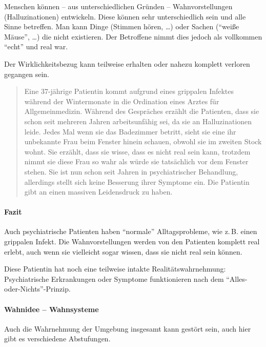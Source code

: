 Menschen können -- aus unterschiedlichen Gründen --
Wahnvorstellungen (Halluzinationen) entwickeln. Diese
können sehr unterschiedlich sein und alle Sinne betreffen.
Man kann Dinge  (Stimmen hören, \ldots)  oder
Sachen  (\enquote{weiße Mäuse}, \ldots) die nicht
existieren. Der Betroffene nimmt dies jedoch als vollkommen
\enquote{echt} und real war. 

Der Wirklichkeitsbezug kann teilweise erhalten oder nahezu
komplett verloren gegangen sein. 




\begin{quotation}
Eine 37-jährige Patientin kommt aufgrund eines
grippalen Infektes während der Wintermonate in die
Ordination eines Arztes für Allgemeinmedizin. Während des
Gespräches erzählt die Patienten, dass sie schon seit
mehreren Jahren arbeitsunfähig sei, da sie an
Halluzinationen leide. Jedes Mal wenn sie das Badezimmer
betritt, sieht sie eine ihr unbekannte Frau beim Fenster
hinein schauen, obwohl sie im zweiten Stock wohnt. Sie
erzählt, dass sie wisse, dass es nicht real sein kann,
trotzdem nimmt sie diese Frau so wahr als würde sie
tatsächlich vor dem Fenster stehen. Sie ist nun schon seit
Jahren in psychiatrischer Behandlung, allerdings stellt
sich keine Besserung ihrer Symptome ein. Die Patientin gibt
an einen massiven Leidensdruck zu haben.
\end{quotation}



\paragraph{Fazit}

Auch psychiatrische Patienten haben \enquote{normale}
Alltagsprobleme, wie z.\,B. einen grippalen Infekt. Die
Wahnvorstellungen werden von den Patienten komplett real
erlebt, auch wenn sie vielleicht sogar wissen, dass sie nicht
real sein können. 

Diese Patientin hat noch eine teilweise
intakte Realitätswahrnehmung: Psychiatrische Erkrankungen
oder Symptome funktionieren  nach dem
\enquote{Alles-oder-Nichts}-Prinzip.


\paragraph{Wahnidee -- Wahnsysteme}

Auch die Wahrnehmung der Umgebung insgesamt kann gestört
sein, auch hier gibt es verschiedene Abstufungen. 

